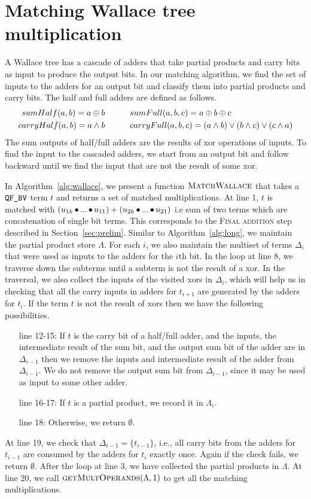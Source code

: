 \section{Matching Wallace tree multiplication}


A Wallace tree has a cascade of adders that take partial products 
and carry bits as input to produce the output bits.
%
In our matching algorithm, we find the set of inputs
to the adders for an output bit and classify them into
partial products and carry bits.
%
The half and full adders are defined as follows.
\begin{align*}
sumHalf(a,b) = a \oplus b  \qquad& \quad sumFull(a,b,c) = a \oplus b \oplus c\\
carryHalf(a,b) = a \land b \qquad&\quad
carryFull(a,b,c) = (a \land b) \lor (b \land c) \lor (c \land a)
\end{align*}
%
The sum outputs of half/full adders are the results of 
xor operations of inputs.
%
To find the input to the cascaded adders, we start from an
output bit and follow backward until we find the input that
are not the result of some xor.

In Algorithm~\ref{alg:wallace}, we present a function
$\textsc{MatchWallace}$ that takes a $\texttt{QF\_BV}$ term $t$ and returns a
set of matched multiplications.
%
At line 1, $t$ is matched with $(u_{1k} \mathop{\bullet} ... \mathop{\bullet} u_{11}) + (u_{2k} \mathop{\bullet} ... \mathop{\bullet} u_{21})$ i.e sum of two terms which are concatenation of single bit terms. This corresponds to the \textsc{Final addition} step described in Section~\ref{sec:prelim}.
%
Similar to Algorithm~\ref{alg:long},
we maintain the partial product store $\Lambda$.
%
For each $i$,
we also maintain the multiset of terms $\Delta_i$ that were used as 
inputs to the adders for the $i$th bit.
%
In the loop at line 8, we traverse down the subterms until
a subterm is not the result of a xor.
%
In the traversal, we also collect the inputs of the visited xors
in $\Delta_i$, which
will help us in checking that all the carry inputs in adders for $t_{i+1}$
are generated by the adders for $t_i$.
%
If the term $t$ is not the result of xors then
we have the following possibilities.
%
\begin{itemize}
\item[line 12-15:]
  If $t$ is the carry bit of a half/full adder, and the inputs, the intermediate
  result of the sum bit, and the output sum bit
  of the adder are in $\Delta_{i-1}$ then we remove the inputs and intermediate result
  of the adder from $\Delta_{i-1}$.
  We do not remove the output sum bit from $\Delta_{i-1}$, since it may be
  used as input to some other adder.
\item[line 16-17:] If $t$ is a partial product, we record it in $\Lambda_i$.
\item[line 18:] Otherwise, we return $\emptyset$.
\end{itemize}
At line 19, we check that $\Delta_{i-1} = \{t_{i-1}\}$, i.e., all carry bits from
the adders for $t_{i-1}$ are consumed by the adders for $t_i$ exactly once.
%
Again if the check fails, we return $\emptyset$.
%
After the loop at line 3, we have collected the partial products in $\Lambda$.
%
At line 20, we call $\textsc{getMultOperands}(\Lambda,1)$ to get all
the matching multiplications.

